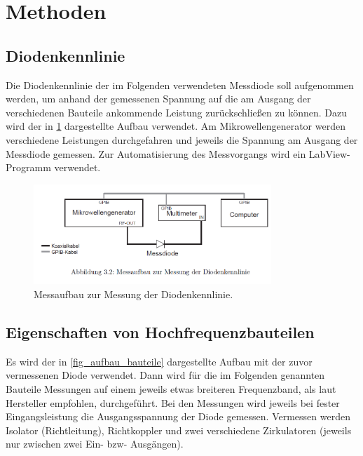 \documentclass[
	a4paper,
	12pt,
	pagesize,
	ngerman
]{scrartcl}
\begin{document}
	\section{Methoden}

	\subsection{Diodenkennlinie}
	Die Diodenkennlinie der im Folgenden verwendeten Messdiode soll aufgenommen werden, um anhand der gemessenen Spannung auf die am Ausgang der verschiedenen Bauteile ankommende Leistung zurückschließen zu können.
	Dazu wird der in \cref{fig_aufbau_kennlinie} dargestellte Aufbau verwendet.
	Am Mikrowellengenerator werden verschiedene Leistungen durchgefahren und jeweils die Spannung am Ausgang der Messdiode gemessen.
	Zur Automatisierung des Messvorgangs wird ein LabView-Programm verwendet.

	\begin{figure}[H]
		\includegraphics[width=0.8\textwidth]{img/aufbau_kennlinie.png}
		\centering
		\caption{
		 	Messaufbau zur Messung der Diodenkennlinie. \cite{Anleitung}
		}
		\label{fig_aufbau_kennlinie}
		\centering
	\end{figure}

	\subsection{Eigenschaften von Hochfrequenzbauteilen}

	Es wird der in \cref{fig_aufbau_bauteile} dargestellte Aufbau mit der zuvor vermessenen Diode verwendet.
	Dann wird für die im Folgenden genannten Bauteile Messungen auf einem jeweils etwas breiteren Frequenzband, als laut Hersteller empfohlen, durchgeführt.
  Bei den Messungen wird jeweils bei fester Eingangsleistung die Ausgangsspannung der Diode gemessen.
	Vermessen werden Isolator (Richtleitung), Richtkoppler und zwei verschiedene Zirkulatoren (jeweils nur zwischen zwei Ein- bzw- Ausgängen).
\end{document}
